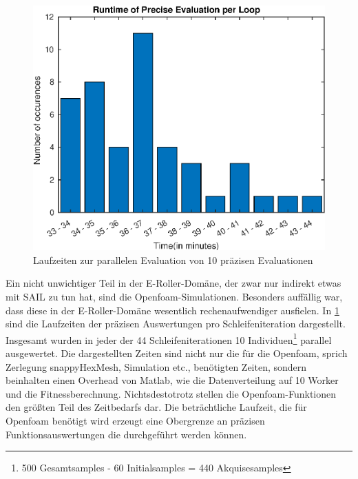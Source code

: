 \begin{figure}[h]
	\centering
	\includegraphics[width=.7\linewidth]{bilder/escooter/peRuntime}
	\caption{Laufzeiten zur parallelen Evaluation von 10 präzisen Evaluationen}
	\label{fig:escooterpeRuntime}
\end{figure}

Ein nicht unwichtiger Teil in der E-Roller-Domäne, der zwar nur indirekt etwas mit SAIL zu tun hat, sind die Openfoam-Simulationen.
Besonders auffällig war, dass diese in der E-Roller-Domäne wesentlich rechenaufwendiger ausfielen.
In \cref{fig:escooterpeRuntime} sind die Laufzeiten der präzisen Auswertungen pro Schleifeniteration dargestellt.
Insgesamt wurden in jeder der 44 Schleifeniterationen 10 Individuen\footnote{500 Gesamtsamples - 60 Initialsamples = 440 Akquisesamples} parallel ausgewertet.
Die dargestellten Zeiten sind nicht nur die für die Openfoam, sprich Zerlegung snappyHexMesh, Simulation etc., benötigten Zeiten, sondern beinhalten einen Overhead von Matlab, wie die Datenverteilung auf 10 Worker und die Fitnessberechnung.
Nichtsdestotrotz stellen die Openfoam-Funktionen den größten Teil des Zeitbedarfs dar.
Die beträchtliche Laufzeit, die für Openfoam benötigt wird erzeugt eine Obergrenze an präzisen Funktionsauswertungen die durchgeführt werden können.


